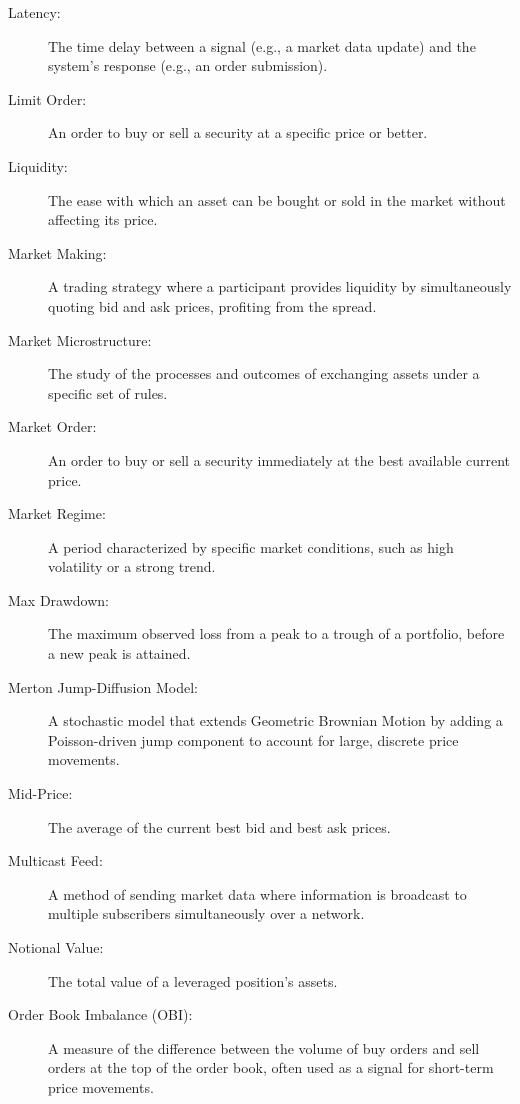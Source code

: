 \begin{description}
    \item[Latency:] The time delay between a signal (e.g., a market data update) and the system's response (e.g., an order submission).
    
    \item[Limit Order:] An order to buy or sell a security at a specific price or better.
    
    \item[Liquidity:] The ease with which an asset can be bought or sold in the market without affecting its price.
    
    \item[Market Making:] A trading strategy where a participant provides liquidity by simultaneously quoting bid and ask prices, profiting from the spread.
    
    \item[Market Microstructure:] The study of the processes and outcomes of exchanging assets under a specific set of rules.
    
    \item[Market Order:] An order to buy or sell a security immediately at the best available current price.
    
    \item[Market Regime:] A period characterized by specific market conditions, such as high volatility or a strong trend.
    
    \item[Max Drawdown:] The maximum observed loss from a peak to a trough of a portfolio, before a new peak is attained.

    \item[Merton Jump-Diffusion Model:] A stochastic model that extends Geometric Brownian Motion by adding a Poisson-driven jump component to account for large, discrete price movements.
    
    \item[Mid-Price:] The average of the current best bid and best ask prices.
    
    \item[Multicast Feed:] A method of sending market data where information is broadcast to multiple subscribers simultaneously over a network.
    
    \item[Notional Value:] The total value of a leveraged position's assets.
    
    \item[Order Book Imbalance (OBI):] A measure of the difference between the volume of buy orders and sell orders at the top of the order book, often used as a signal for short-term price movements.
    

\end{description}
